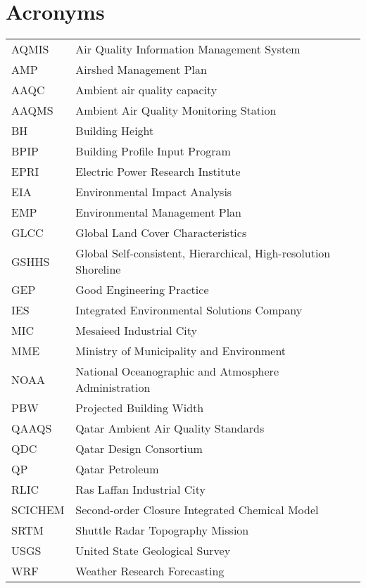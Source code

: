 \chapter{Acronyms}


\begin{tabular}{ll}
AQMIS & Air Quality Information Management System \\
AMP & Airshed Management Plan \\
AAQC & Ambient air quality capacity \\
AAQMS & Ambient Air Quality Monitoring Station \\
BH & Building Height \\
BPIP & Building Profile Input Program \\
EPRI & Electric Power Research Institute \\
EIA & Environmental Impact Analysis \\
EMP & Environmental Management Plan \\
GLCC & Global Land Cover Characteristics \\
GSHHS & Global Self-consistent, Hierarchical, High-resolution Shoreline \\
GEP & Good Engineering Practice \\
IES & Integrated Environmental Solutions Company \\
MIC & Mesaieed Industrial City \\
MME & Ministry of Municipality and Environment \\
NOAA & National Oceanographic and Atmosphere Administration \\
PBW & Projected Building Width \\
QAAQS & Qatar Ambient Air Quality Standards \\
QDC & Qatar Design Consortium \\
QP & Qatar Petroleum \\
RLIC & Ras Laffan Industrial City \\
SCICHEM & Second-order Closure Integrated Chemical Model \\
SRTM & Shuttle Radar Topography Mission \\
USGS & United State Geological Survey \\
WRF & Weather Research Forecasting
\end{tabular}
